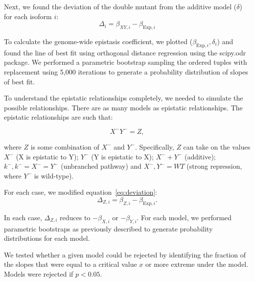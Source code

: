 \documentclass[9pt,twocolumn,twoside]{pnas-new}
\begin{document}
{Next, we found the deviation of the double mutant from the additive model ($\delta$)
for each isoform $i$:
\begin{equation}
  \Delta_i = \beta_{XY,i} - \beta_{\mathrm{Exp},i}
  \label{eq:deviation}
\end{equation}

To calculate the genome-wide epistasis coefficient, we plotted
($\beta_{\mathrm{Exp},i}, \delta_i$) and found the line of best fit using
orthogonal distance regression using the scipy.odr package. We performed a
parametric bootstrap sampling the ordered tuples with replacement using 5,000
iterations to generate a probability distribution of slopes of best fit.

To understand the epistatic relationships completely, we needed to simulate the
possible relationships.
There are as many models as epistatic relationships. The epistatic relationships
are such that:

\begin{equation}
  X^-Y^- = Z,
\end{equation}

where $Z$ is some combination of $X^-$ and $Y^-$. Specifically, $Z$ can take on
the values $X^-$ (X is epistatic to Y); $Y^-$ (Y is epistatic to X);
$X^- + Y^-$ (additive); $k^-, k^-=X^-=Y^-$ (unbranched pathway) and
$X^-, Y^-=WT$ (strong repression, where $Y^-$ is wild-type).

For each case, we modified equation~\ref{eq:deviation}:
\begin{equation}
  \Delta_{Z,i} = \beta_{Z,i} - \beta_{\mathrm{Exp},i}.
\end{equation}

In each case, $\Delta_{Z,i}$ reduces to $-\beta_{X,i}$ or $-\beta_{Y,i}$. For each
model, we performed parametric bootstraps as previously described to generate
probability distributions for each model.

We tested whether a given model could be rejected by identifying the fraction
of the slopes that were equal to a critical value $x$ or more extreme under the model.
Models were rejected if $p<0.05$.


}

\showmatmethods{}%


\showacknow{} %



\end{document}
